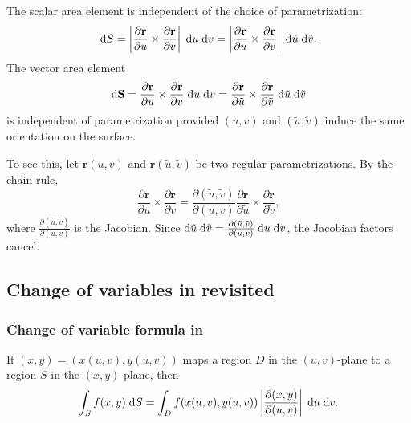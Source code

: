 \documentclass[a4paper]{article}
\begin{document}
\begin{prop}
  The scalar area element is independent of the choice of parametrization:
  \[
    \mathrm{d} S = \left|\frac{\partial \mathbf{r}}{\partial u}\times\frac{\partial\mathbf{r}}{\partial v}\right|\;\mathrm{d} u\;\mathrm{d} v = \left|\frac{\partial \mathbf{r}}{\partial \tilde {u}}\times\frac{\partial\mathbf{r}}{\partial \tilde{v}}\right| \;\mathrm{d} \tilde{u}\;\mathrm{d} \tilde{v}.
  \]
  The vector area element
  \[
    \mathrm{d} \mathbf{S} = \frac{\partial \mathbf{r}}{\partial u}\times\frac{\partial\mathbf{r}}{\partial v}\;\mathrm{d} u\;\mathrm{d} v = \frac{\partial \mathbf{r}}{\partial \tilde {u}}\times\frac{\partial\mathbf{r}}{\partial \tilde{v}} \;\mathrm{d} \tilde{u}\;\mathrm{d} \tilde{v}
  \]
  is independent of parametrization provided $(u, v)$ and $(\tilde{u}, \tilde{v})$ induce the same orientation on the surface.
\end{prop}

\begin{rmk}
  To see this, let $\mathbf{r}(u, v)$ and $\mathbf{r}(\tilde{u}, \tilde{v})$ be two regular parametrizations. By the chain rule,
  \[
    \frac{\partial \mathbf{r}}{\partial u}\times\frac{\partial\mathbf{r}}{\partial v} = \frac{\partial (\tilde{u}, \tilde{v})}{\partial (u, v)} \frac{\partial \mathbf{r}}{\partial \tilde {u}}\times\frac{\partial\mathbf{r}}{\partial \tilde{v}},
  \]
  where $\frac{\partial (\tilde{u}, \tilde{v})}{\partial(u, v)}$ is the Jacobian. Since $\mathrm{d} \tilde{u}\;\mathrm{d} \tilde{v} = \frac{\partial (\tilde{u}, \tilde{v})}{\partial (u, v)}\;\mathrm{d} u\;\mathrm{d} v$, the Jacobian factors cancel.
\end{rmk}

\subsection{Change of variables in  revisited}

\subsubsection*{Change of variable formula in }

\begin{prop}
  If $(x, y) = (x(u, v), y(u, v))$ maps a region $D$ in the $(u, v)$-plane to a region $S$ in the $(x, y)$-plane, then
  \[
    \int_S f(x, y)\;\mathrm{d} S = \int_D f(x(u, v), y(u, v)) \left|\frac{\partial(x, y)}{\partial(u, v)}\right|\;\mathrm{d} u\;\mathrm{d} v.
  \]
\end{prop}
\end{document}

